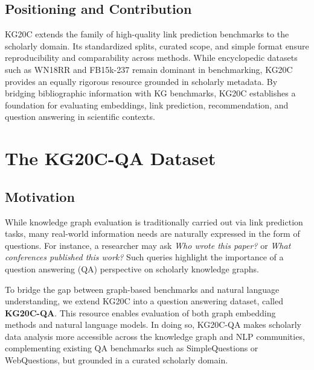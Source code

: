 \documentclass[conference]{IEEEtran}
\begin{document}
\subsection{Positioning and Contribution}
KG20C extends the family of high-quality link prediction benchmarks to the scholarly domain. Its standardized splits, curated scope, and simple format ensure reproducibility and comparability across methods. While encyclopedic datasets such as WN18RR and FB15k-237 remain dominant in benchmarking, KG20C provides an equally rigorous resource grounded in scholarly metadata. By bridging bibliographic information with KG benchmarks, KG20C establishes a foundation for evaluating embeddings, link prediction, recommendation, and question answering in scientific contexts.


\section{The KG20C-QA Dataset}
\label{sec:kg20cqa}

\subsection{Motivation}
While knowledge graph evaluation is traditionally carried out via link prediction tasks, many real-world information needs are naturally expressed in the form of questions. For instance, a researcher may ask \textit{Who wrote this paper?} or \textit{What conferences published this work?} Such queries highlight the importance of a question answering (QA) perspective on scholarly knowledge graphs. 

To bridge the gap between graph-based benchmarks and natural language understanding, we extend KG20C into a question answering dataset, called \textbf{KG20C-QA}. This resource enables evaluation of both graph embedding methods and natural language models. In doing so, KG20C-QA makes scholarly data analysis more accessible across the knowledge graph and NLP communities, complementing existing QA benchmarks such as SimpleQuestions or WebQuestions, but grounded in a curated scholarly domain.
\end{document}

